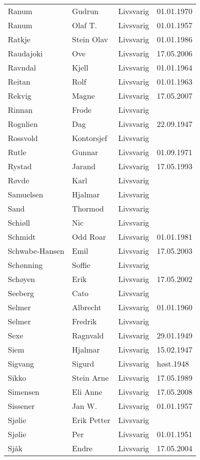 \begin{longtable}{llll}
Ranum	&	Gudrun	&	Livsvarig 	&	01.01.1970	\\
Ranum	&	Olaf T.	&	Livsvarig 	&	01.01.1957	\\
Ratkje	&	Stein Olav	&	Livsvarig 	&	01.01.1986	\\
Raudajoki	&	Ove	&	Livsvarig	&	17.05.2006	\\
Ravndal	&	Kjell	&	Livsvarig 	&	01.01.1964	\\
Reitan	&	Rolf	&	Livsvarig 	&	01.01.1963	\\
Rekvig	&	Magne	&	Livsvarig	&	17.05.2007	\\
Rinnan	&	Frode	&	Livsvarig 	&		\\
Rognlien	&	Dag	&	Livsvarig 	&	22.09.1947	\\
Rossvold	&	Kontorsjef	&	Livsvarig 	&		\\
Rutle	&	Gunnar	&	Livsvarig 	&	01.09.1971	\\
Rystad	&	Jarand	&	Livsvarig 	&	17.05.1993	\\
Røvde	&	Karl	&	Livsvarig 	&		\\
Samuelsen	&	Hjalmar	&	Livsvarig 	&		\\
Sand	&	Thormod	&	Livsvarig 	&		\\
Schiøll	&	Nic	&	Livsvarig 	&		\\
Schmidt	&	Odd Roar	&	Livsvarig 	&	01.01.1981	\\
Schwabe-Hansen 	&	Emil	&	Livsvarig	&	17.05.2003	\\
Schønning	&	Soffie	&	Livsvarig 	&		\\
Schøyen 	&	Erik	&	Livsvarig	&	17.05.2002	\\
Seeberg	&	Cato	&	Livsvarig 	&		\\
Selmer	&	Albrecht	&	Livsvarig 	&	01.01.1960	\\
Selmer	&	Fredrik	&	Livsvarig 	&		\\
Sexe	&	Ragnvald	&	Livsvarig 	&	29.01.1949	\\
Siem	&	Hjalmar	&	Livsvarig 	&	15.02.1947	\\
Sigvang	&	Sigurd	&	Livsvarig	&	høst.1948	\\
Sikko	&	Stein Arne	&	Livsvarig 	&	17.05.1989	\\
Simensen	&	Eli Anne	&	Livsvarig	&	17.05.2008	\\
Sissener	&	Jan W.	&	Livsvarig 	&	01.01.1957	\\
Sjølie	&	Erik Petter	&	Livsvarig 	&		\\
Sjølie	&	Per	&	Livsvarig 	&	01.01.1951	\\
Sjåk 	&	Endre	&	Livsvarig	&	17.05.2004	\\

\end{longtable}
